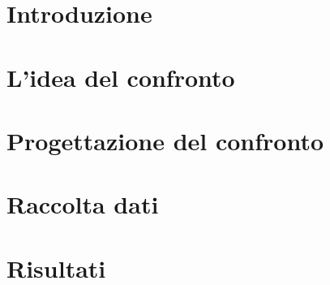 \documentclass[a4paper,12pt]{report}
\begin{document}
\chapter{Introduzione}


\chapter{L'idea del confronto}


\chapter{Progettazione del confronto}


\chapter{Raccolta dati}


\chapter{Risultati}




\end{document}
